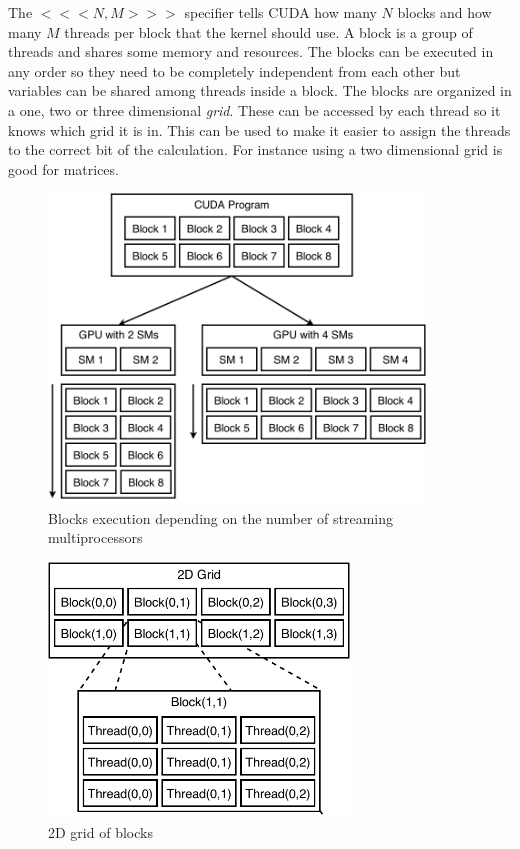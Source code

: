 \documentclass[10pt,a4paper]{report}
\begin{document}
The $<<<N,M>>>$ specifier tells CUDA how many $N$ blocks and how many $M$ threads per block that the kernel should use\cite{cuda}. A block is a group of threads and shares some memory and resources. The blocks can be executed in any order so they need to be completely independent from each other but variables can be shared among threads inside a block. The blocks are  organized in a one, two or three dimensional \emph{grid}. These can be accessed by each thread so it knows which grid it is in. This can be used to make it easier to assign the threads to the correct bit of the calculation. For instance using a two dimensional grid is good for matrices\cite{cuda, cuda_best_practice}.

\begin{figure}[h]
    \centering
    \includegraphics[width=10cm]{grid_scale.png}
    \caption{Blocks execution depending on the number of streaming multiprocessors}
    \label{fig:blocks_scaling}
\end{figure}

\begin{figure}[h]
    \centering
    \includegraphics[width=8cm]{2D_grid.png}
    \caption{2D grid of blocks}
    \label{fig:grid_2d}
\end{figure}
\end{document}
